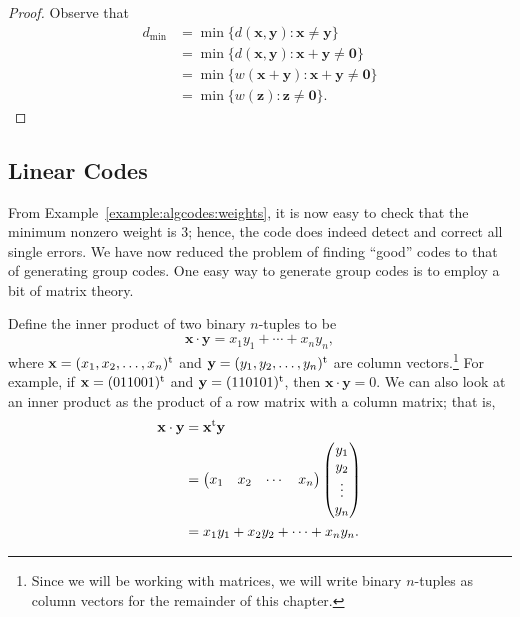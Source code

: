  
\begin{proof}
Observe that
\begin{align*}
d_{\min} & =  \min \{ d({\mathbf x},{\mathbf y}) : {\mathbf x}
\neq
{\mathbf y} \} \\
&=  \min \{ d({\mathbf x},{\mathbf y}) : {\mathbf x}+{\mathbf y}
\neq {\mathbf 0} \} \\
&= \min\{ w({\mathbf x} + {\mathbf y}) : {\mathbf x}+{\mathbf y}
\neq {\mathbf 0} \} \\
& =  \min\{ w({\mathbf z}) : {\mathbf z} \neq {\mathbf 0} \}.
\end{align*}
\end{proof}
 
 
\subsection*{Linear Codes}
 
 
From Example~\ref{example:algcodes:weights}, it is now easy to check that the minimum nonzero
weight is 3; hence, the code does indeed detect and correct all
single errors. We have now reduced the problem of finding ``good''
codes to that of generating group codes. One easy way to generate
group codes is to employ a bit of matrix theory. 
 
 
Define the {\bfi inner product\/} of two binary
$n$-tuples to be 
\[
{\mathbf x} \cdot {\mathbf y} = x_1 y_1 + \cdots + x_n y_n,
\]
where ${\mathbf x} = (x_1, x_2, \ldots, x_n)^{\rm t}$ and ${\mathbf y} =
(y_1, y_2, \ldots, y_n)^{\rm t}$ are column vectors.\footnote{Since we
will be working with matrices, we will write binary $n$-tuples as
column vectors for the remainder of this chapter.} For example, if
${\mathbf x} = (011001)^{\rm t}$ and ${\mathbf y} = (110101)^{\rm t}$,
then ${\mathbf x} \cdot {\mathbf y} = 0$. We can also look at an inner
product as the product of a row matrix with a column matrix; that is, 
\begin{align*}
{\mathbf x} \cdot {\mathbf y} & = {\mathbf x}^{\rm t}  {\mathbf y}
\\
& =
\begin{pmatrix}
x_1 & x_2 & \cdots & x_n
\end{pmatrix}
\begin{pmatrix}
y_1 \\
y_2 \\
\vdots \\
y_n
\end{pmatrix} \\
& =
x_{1}y_{1} + x_{2}y_{2} + \cdots + x_{n}y_{n}.
\end{align*}
 
